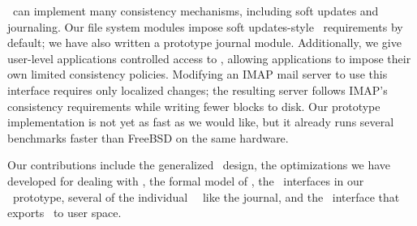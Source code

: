 \Patches\ can implement many consistency mechanisms, including
 soft updates and journaling.
%
Our file system modules impose soft updates-style \patch\
 requirements by default; we have also written a prototype journal module. 
%
Additionally, we give user-level applications controlled access to \patches,
allowing applications to impose their own limited consistency
 policies.
%
Modifying an IMAP mail server to use this interface requires only localized
 changes; the resulting server follows IMAP's consistency
 requirements while writing fewer blocks to disk.
%
Our prototype implementation is not yet as fast as we would like, but it
 already runs several benchmarks faster than FreeBSD on the same hardware.

\begin{comment}
 not ACID transactions: transactions should be independent, but any file
 system client can observe all active \patches), we believe that using
 \patches\ will allow the construction of consistent, modular, extensible
 file systems that are much easier to understand.
\end{comment}


Our contributions include the generalized \patch\ design, the
 optimizations we have developed for dealing with \patches, the formal
 model of \patches, the \module\ interfaces in our \Kudos\ prototype,
 several of the individual \Kudos\ \modules\ like the journal, and the
 \patchgroup\ interface that exports \patches\ to user space.


